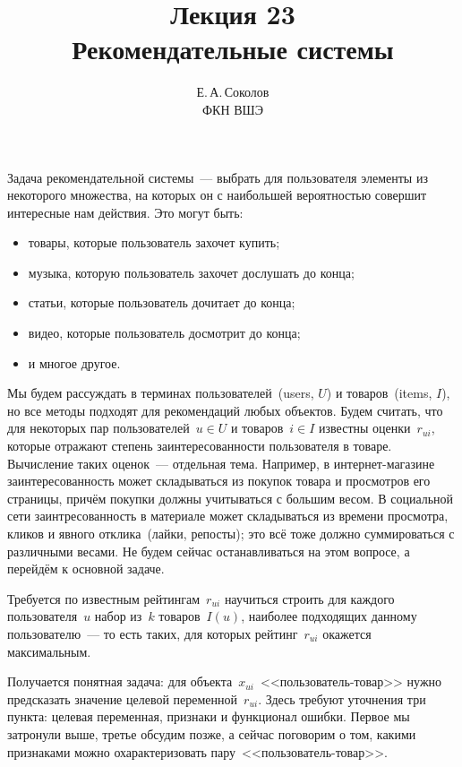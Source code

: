 \documentclass[12pt,fleqn]{article}
\begin{document}
\title{Лекция 23\\Рекомендательные системы}
\author{Е.\,А.\,Соколов\\ФКН ВШЭ}
\maketitle

Задача рекомендательной системы~--- выбрать для пользователя элементы из некоторого множества,
на которых он с наибольшей вероятностью совершит интересные нам действия.
Это могут быть:
\begin{itemize}
    \item товары, которые пользователь захочет купить;
    \item музыка, которую пользователь захочет дослушать до конца;
    \item статьи, которые пользователь дочитает до конца;
    \item видео, которые пользователь досмотрит до конца;
    \item и многое другое.
\end{itemize}

Мы будем рассуждать в терминах пользователей~(users, $U$) и товаров~(items, $I$),
но все методы подходят для рекомендаций любых объектов.
Будем считать, что для некоторых пар пользователей~$u \in U$ и товаров~$i \in I$ известны
оценки~$r_{ui}$, которые отражают степень заинтересованности пользователя в товаре.
Вычисление таких оценок~--- отдельная тема.
Например, в интернет-магазине заинтересованность может складываться из покупок товара
и просмотров его страницы, причём покупки должны учитываться с большим весом.
В социальной сети заинтресованность в материале может складываться из времени просмотра,
кликов и явного отклика~(лайки, репосты); это всё тоже должно суммироваться с различными весами.
Не будем сейчас останавливаться на этом вопросе, а перейдём к основной задаче.

Требуется по известным рейтингам~$r_{ui}$ научиться строить для каждого пользователя~$u$
набор из~$k$ товаров~$I(u)$, наиболее подходящих данному пользователю~--- то есть таких,
для которых рейтинг~$r_{ui}$ окажется максимальным.

Получается понятная задача: для объекта~$x_{ui}$~<<пользователь-товар>> нужно предсказать значение
целевой переменной~$r_{ui}$.
Здесь требуют уточнения три пункта: целевая переменная, признаки и функционал ошибки.
Первое мы затронули выше, третье обсудим позже, а сейчас поговорим о том,
какими признаками можно охарактеризовать пару~<<пользователь-товар>>.
\end{document}
